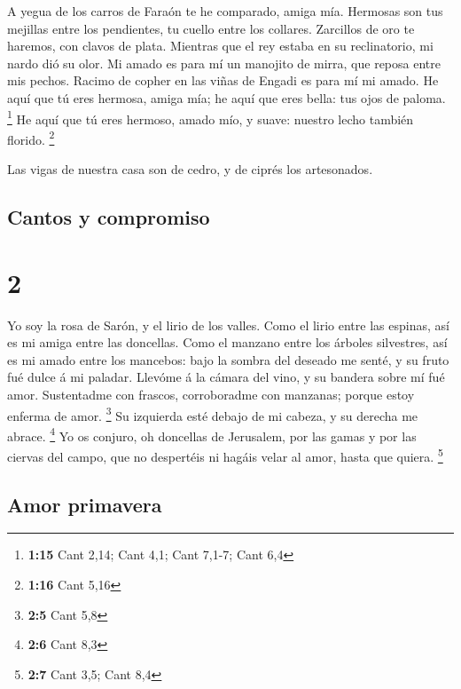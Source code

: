  A yegua de los carros de Faraón te he comparado, amiga mía.
 Hermosas son tus mejillas entre los pendientes, tu cuello
entre los collares.  Zarcillos de oro te haremos, con
clavos de plata.  Mientras que el rey estaba en su
reclinatorio, mi nardo dió su olor.  Mi amado es para mí un
manojito de mirra, que reposa entre mis pechos.  Racimo de
copher en las viñas de Engadi es para mí mi amado.  He aquí
que tú eres hermosa, amiga mía; he aquí que eres bella: tus ojos de
paloma. \footnote{\textbf{1:15} Cant 2,14; Cant 4,1; Cant 7,1-7; Cant
  6,4}  He aquí que tú eres hermoso, amado mío, y suave:
nuestro lecho también florido. \footnote{\textbf{1:16} Cant 5,16}

 Las vigas de nuestra casa son de cedro, y de ciprés los
artesonados.

\hypertarget{cantos-y-compromiso}{%
\subsection{Cantos y compromiso}\label{cantos-y-compromiso}}

\hypertarget{section-1}{%
\section{2}\label{section-1}}

 Yo soy la rosa de Sarón, y el lirio de los valles.
 Como el lirio entre las espinas, así es mi amiga entre las
doncellas.  Como el manzano entre los árboles silvestres,
así es mi amado entre los mancebos: bajo la sombra del deseado me senté,
y su fruto fué dulce á mi paladar.  Llevóme á la cámara del
vino, y su bandera sobre mí fué amor.  Sustentadme con
frascos, corroboradme con manzanas; porque estoy enferma de amor.
\footnote{\textbf{2:5} Cant 5,8}  Su izquierda esté debajo
de mi cabeza, y su derecha me abrace. \footnote{\textbf{2:6} Cant 8,3}
 Yo os conjuro, oh doncellas de Jerusalem, por las gamas y
por las ciervas del campo, que no despertéis ni hagáis velar al amor,
hasta que quiera. \footnote{\textbf{2:7} Cant 3,5; Cant 8,4}

\hypertarget{amor-primavera}{%
\subsection{Amor primavera}\label{amor-primavera}}

